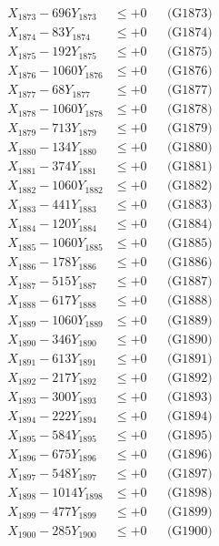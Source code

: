 \documentclass[a4paper,10pt]{article}
\begin{document}
{\begin{align}
X_{1873} - 696Y_{1873} &\leq +0 && \text{(G1873)} \\
X_{1874} - 83Y_{1874} &\leq +0 && \text{(G1874)} \\
X_{1875} - 192Y_{1875} &\leq +0 && \text{(G1875)} \\
X_{1876} - 1060Y_{1876} &\leq +0 && \text{(G1876)} \\
X_{1877} - 68Y_{1877} &\leq +0 && \text{(G1877)} \\
X_{1878} - 1060Y_{1878} &\leq +0 && \text{(G1878)} \\
X_{1879} - 713Y_{1879} &\leq +0 && \text{(G1879)} \\
X_{1880} - 134Y_{1880} &\leq +0 && \text{(G1880)} \\
\allowbreak
X_{1881} - 374Y_{1881} &\leq +0 && \text{(G1881)} \\
X_{1882} - 1060Y_{1882} &\leq +0 && \text{(G1882)} \\
X_{1883} - 441Y_{1883} &\leq +0 && \text{(G1883)} \\
X_{1884} - 120Y_{1884} &\leq +0 && \text{(G1884)} \\
X_{1885} - 1060Y_{1885} &\leq +0 && \text{(G1885)} \\
X_{1886} - 178Y_{1886} &\leq +0 && \text{(G1886)} \\
X_{1887} - 515Y_{1887} &\leq +0 && \text{(G1887)} \\
X_{1888} - 617Y_{1888} &\leq +0 && \text{(G1888)} \\
X_{1889} - 1060Y_{1889} &\leq +0 && \text{(G1889)} \\
X_{1890} - 346Y_{1890} &\leq +0 && \text{(G1890)} \\
\allowbreak
X_{1891} - 613Y_{1891} &\leq +0 && \text{(G1891)} \\
X_{1892} - 217Y_{1892} &\leq +0 && \text{(G1892)} \\
X_{1893} - 300Y_{1893} &\leq +0 && \text{(G1893)} \\
X_{1894} - 222Y_{1894} &\leq +0 && \text{(G1894)} \\
X_{1895} - 584Y_{1895} &\leq +0 && \text{(G1895)} \\
X_{1896} - 675Y_{1896} &\leq +0 && \text{(G1896)} \\
X_{1897} - 548Y_{1897} &\leq +0 && \text{(G1897)} \\
X_{1898} - 1014Y_{1898} &\leq +0 && \text{(G1898)} \\
X_{1899} - 477Y_{1899} &\leq +0 && \text{(G1899)} \\
X_{1900} - 285Y_{1900} &\leq +0 && \text{(G1900)} \\

\end{align}}
\end{document}
